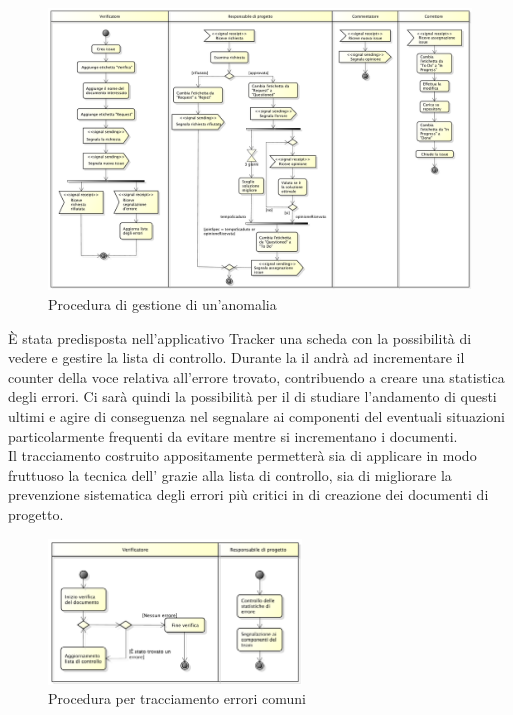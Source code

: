 			\begin{figure}[H]
					\centering
					\includegraphics[width=1.0\textwidth]{NormeDiProgetto/Pics/GestioneAnomalia}
					\caption{Procedura di gestione di un'anomalia}
				\end{figure}
				\label{sec:tracciamento}
					È stata predisposta nell'applicativo Tracker una scheda con la possibilità di vedere e gestire la lista di controllo. Durante la  il  andrà ad incrementare il counter della voce relativa all'errore trovato, contribuendo a creare una statistica degli errori. Ci sarà quindi la possibilità per il  di studiare l'andamento di questi ultimi e agire di conseguenza nel segnalare ai componenti del  eventuali situazioni particolarmente frequenti da evitare mentre si incrementano i documenti.\\ Il tracciamento costruito appositamente permetterà sia di applicare in modo fruttuoso la tecnica dell'\textit{} grazie alla lista di controllo, sia di migliorare la prevenzione sistematica degli errori più critici in  di creazione dei documenti di progetto.
					\begin{figure}[H]
							\centering
							\includegraphics[width=0.6\textwidth]{NormeDiProgetto/Pics/ProceduraDecrementoErrori}
							\caption{Procedura per tracciamento errori comuni}
					\end{figure}

